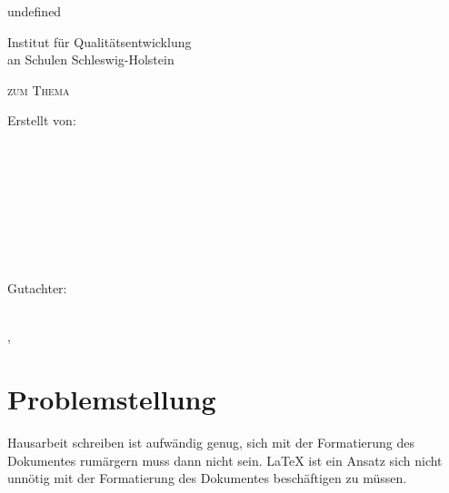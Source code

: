 undefined

	
	\begin{titlepage}
		Institut für Qualitätsentwicklung\\
		an Schulen Schleswig-Holstein
		\begin{center}
			\vspace{1.5cm}
			{\scshape\large \haDeckblattTextEins \par}
			\vspace{1cm}
			{\scshape\large zum Thema\par}
			\vspace{1.5cm}
			{\LARGE\bfseries \haThema \par}
			\vfill
			{Erstellt von:\\ {\bfseries \haAutor}\\ \haAutorAdresse\\ \haAutorPLZ~\haAutorOrt \par}
			\vspace{1cm}
			{\haDeckblattTextZwei \\ \haSchule \\ \haSchuleAdresse \\ \haSchulePLZ~\haSchuleOrt \par}
			\vspace{1cm}
			Gutachter:\\ {\bfseries \haGutachter}\\ \haGutachterText
			\vfill
		\end{center}
		{\haAutorOrt,~\datumVonHeute\par}
	\end{titlepage}
	\thispagestyle{empty}
	\newpage
	
	\tableofcontents
	\thispagestyle{empty}
	\newpage
	
	\setcounter{page}{1}
	
	

	
	
	\section{Problemstellung}
	
	Hausarbeit schreiben ist aufwändig genug, sich mit der Formatierung des Dokumentes rumärgern muss dann nicht sein. \LaTeX{} ist ein Ansatz sich nicht unnötig mit der Formatierung des Dokumentes beschäftigen zu müssen.
	

